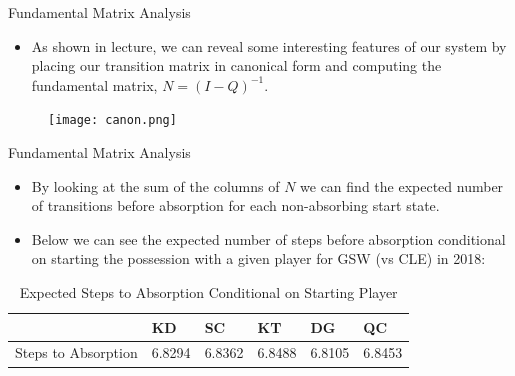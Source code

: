 \documentclass{beamer}
\begin{document}
\begin{frame}{Fundamental Matrix Analysis}
\begin{itemize}
    \item As shown in lecture, we can reveal some interesting features of our system by placing our transition matrix in canonical form and computing the fundamental matrix, $N = (I-Q)^{-1}$.
\end{itemize}
\begin{figure}
    \centering
    \texttt{[image: canon.png]}
\end{figure}
\end{frame}

\begin{frame}{Fundamental Matrix Analysis}
\begin{itemize}
    \item By looking at the sum of the columns of $N$ we can find the expected number of transitions before absorption for each non-absorbing start state. 
    \item Below we can see the expected number of steps before absorption conditional on starting the possession with a given player for GSW (vs CLE) in 2018:
\end{itemize}

\vspace{-2mm}

\begin{table}[H]
\centering
\begin{tabular}{l|l|l|l|l|l}
         & KD & SC & KT & DG & QC \\ \hline
Steps to Absorption  & 6.8294   & 6.8362   & 6.8488   & 6.8105   & 6.8453   \\
\end{tabular}
\caption{Expected Steps to Absorption Conditional on Starting Player}
\end{table}
\end{frame}
\end{document}
